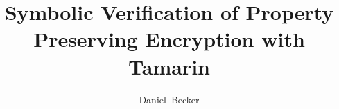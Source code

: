 \documentclass[journal]{IEEEtran}
\begin{document}
%
\title{Symbolic Verification of Property Preserving Encryption with Tamarin}
%
%

\author{Daniel~Becker}
% 
%
\end{document}
